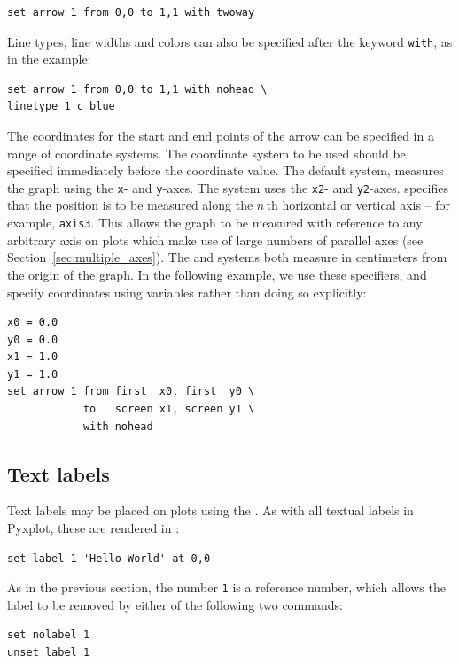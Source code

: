 \begin{verbatim}
set arrow 1 from 0,0 to 1,1 with twoway
\end{verbatim}

\noindent Line types, line widths and colors can also be specified after the
keyword {\tt with}, as in the example:

\begin{verbatim}
set arrow 1 from 0,0 to 1,1 with nohead \
linetype 1 c blue
\end{verbatim}

The coordinates for the start and end points of the arrow can be specified in a
range of coordinate systems. The coordinate system to be used should be
specified immediately before the coordinate value. The default system,
\indcot{first} measures the graph using the {\tt x}- and {\tt y}-axes. The
\indcot{second} system uses the {\tt x2}- and {\tt y2}-axes. 
specifies that the position is to be measured along the $n\,$th horizontal or
vertical axis -- for example, {\tt axis3}.\indcmd{set arrow} This allows the
graph to be measured with reference to any arbitrary axis on plots which make
use of large numbers of parallel axes (see Section~\ref{sec:multiple_axes}).
The \indcot{page} and \indcot{graph} systems both measure in centimeters from
the origin of the graph. In the following example, we use these specifiers, and
specify coordinates using variables rather than doing so explicitly:

\begin{verbatim}
x0 = 0.0
y0 = 0.0
x1 = 1.0
y1 = 1.0
set arrow 1 from first  x0, first  y0 \
            to   screen x1, screen y1 \
            with nohead
\end{verbatim}

\subsection{Text labels}

Text labels may be placed on plots using the . As with all
textual labels in Pyxplot, these are rendered in \latexdcf:

\begin{verbatim}
set label 1 'Hello World' at 0,0
\end{verbatim}

As in the previous section, the number {\tt 1} is a reference number, which
allows the label to be removed by either of the following two commands:

\begin{verbatim}
set nolabel 1
unset label 1
\end{verbatim}

